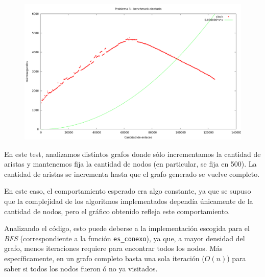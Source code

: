 \begin{figure}[h]
  \begin{center}
    \includegraphics[scale=0.35]{imagenes/grafico-3-m.png}
  \end{center}
\end{figure}

\vspace*{0.5cm}

En este test, analizamos distintos grafos donde sólo incrementamos la cantidad de aristas y mantenemos fija la cantidad de nodos (en particular, se fija en 500). La cantidad de aristas se incrementa hasta que el grafo generado se vuelve completo.

En este caso, el comportamiento esperado era algo constante, ya que se supuso que la complejidad de los algoritmos implementados dependía únicamente de la cantidad de nodos, pero el gráfico obtenido refleja este comportamiento.

Analizando el código, esto puede deberse a la implementación escogida para el
\textit{BFS} (correspondiente a la función \verb|es_conexo|), ya que, a mayor densidad del grafo, menos iteraciones requiere para encontrar todos los nodos.
Más específicamente, en un grafo completo basta una sola iteración ($O(n)$) para saber si todos los nodos fueron ó no ya visitados.
